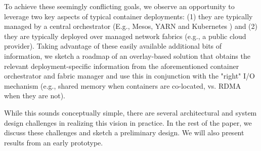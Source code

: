 To achieve these seemingly conflicting goals, we observe an opportunity to
leverage two key aspects of typical container deployments: (1) they are
typically managed by a central orchestrator (E.g., Mesos, YARN and Kubernetes
\cite{mesos,yarn,kubernetes}) and (2) they are typically deployed over managed network
fabrics (e.g., a public cloud provider). Taking advantage of these easily
available additional bits of information, we sketch a roadmap of an
overlay-based solution that obtains the relevant deployment-specific
information from the aforementioned container orchestrator and fabric manager
and use this in conjunction with the "right" I/O mechanism (e.g., shared memory
when containers are co-located, vs. RDMA when they are not). 

While this sounds conceptually simple, there are several architectural
and system design challenges in realizing this vision in practice. In the rest
of the paper, we discuss these challenges and sketch a preliminary design. We
will also present results from an early prototype.
